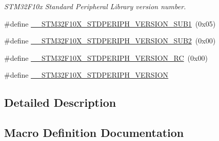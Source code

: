 \begin{DoxyCompactItemize}
\begin{DoxyCompactList}\small\item\em S\+T\+M32\+F10x Standard Peripheral Library version number. \end{DoxyCompactList}\item 
\#define \hyperlink{group___library__configuration__section_ga7ce69a7c755b9d0551e9755d28612cb0}{\+\_\+\+\_\+\+S\+T\+M32\+F10\+X\+\_\+\+S\+T\+D\+P\+E\+R\+I\+P\+H\+\_\+\+V\+E\+R\+S\+I\+O\+N\+\_\+\+S\+U\+B1}~(0x05)
\item 
\#define \hyperlink{group___library__configuration__section_ga3ec41777ab08436b801c9c295248a6c7}{\+\_\+\+\_\+\+S\+T\+M32\+F10\+X\+\_\+\+S\+T\+D\+P\+E\+R\+I\+P\+H\+\_\+\+V\+E\+R\+S\+I\+O\+N\+\_\+\+S\+U\+B2}~(0x00)
\item 
\#define \hyperlink{group___library__configuration__section_gae0abedef178fde6294fdfd3401ef6e2c}{\+\_\+\+\_\+\+S\+T\+M32\+F10\+X\+\_\+\+S\+T\+D\+P\+E\+R\+I\+P\+H\+\_\+\+V\+E\+R\+S\+I\+O\+N\+\_\+\+RC}~(0x00)
\item 
\#define \hyperlink{group___library__configuration__section_gafb19c8675ea01accc2f8e5f467827328}{\+\_\+\+\_\+\+S\+T\+M32\+F10\+X\+\_\+\+S\+T\+D\+P\+E\+R\+I\+P\+H\+\_\+\+V\+E\+R\+S\+I\+ON}
\end{DoxyCompactItemize}


\subsection{Detailed Description}


\subsection{Macro Definition Documentation}

